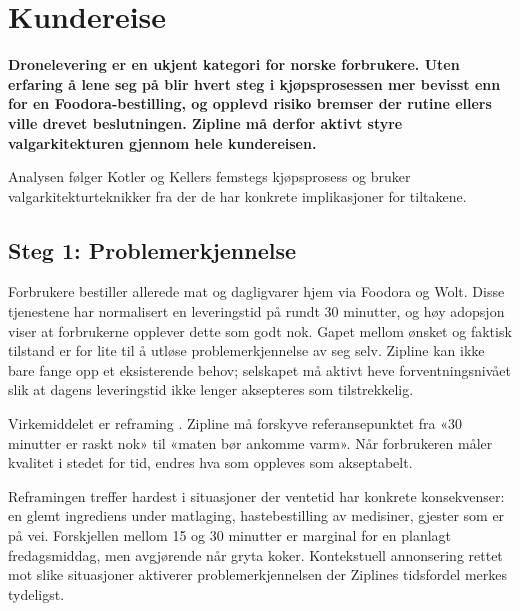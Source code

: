 \documentclass[12pt, a4paper]{article}
\begin{document}

\section{Kundereise}

\textbf{Dronelevering er en ukjent kategori for norske forbrukere. Uten
erfaring å lene seg på blir hvert steg i kjøpsprosessen mer bevisst enn for
en Foodora-bestilling, og opplevd risiko bremser der rutine ellers ville
drevet beslutningen. Zipline må derfor aktivt styre valgarkitekturen
gjennom hele kundereisen.}

Analysen følger Kotler og Kellers femstegs kjøpsprosess
\parencite{kotlerkeller2016} og bruker valgarkitekturteknikker fra
\textcite{muenscher2016} der de har konkrete implikasjoner for tiltakene.

\subsection{Steg 1: Problemerkjennelse}

Forbrukere bestiller allerede mat og dagligvarer hjem via Foodora og Wolt.
Disse tjenestene har normalisert en leveringstid på rundt 30 minutter, og
høy adopsjon viser at forbrukerne opplever dette som godt nok. Gapet mellom
ønsket og faktisk tilstand \parencite[jf.][]{kotlerkeller2016} er for lite
til å utløse problemerkjennelse av seg selv. Zipline kan ikke bare fange
opp et eksisterende behov; selskapet må aktivt heve forventningsnivået slik
at dagens leveringstid ikke lenger aksepteres som tilstrekkelig.

Virkemiddelet er reframing
\parencite[jf.\ reframe-teknikken i][]{muenscher2016}. Zipline må
forskyve referansepunktet fra «30 minutter er raskt nok» til «maten bør
ankomme varm». Når forbrukeren måler kvalitet i stedet for tid, endres hva
som oppleves som akseptabelt.

Reframingen treffer hardest i situasjoner der ventetid har konkrete
konsekvenser: en glemt ingrediens under matlaging, hastebestilling av
medisiner, gjester som er på vei. Forskjellen mellom 15 og 30 minutter er
marginal for en planlagt fredagsmiddag, men avgjørende når gryta koker.
Kontekstuell annonsering rettet mot slike situasjoner aktiverer
problemerkjennelsen der Ziplines tidsfordel merkes tydeligst.
\end{document}
